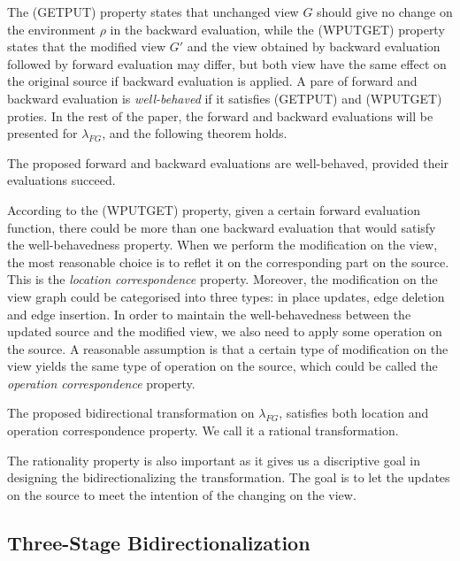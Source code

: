 \documentclass{llncs}
\begin{document}
The (GETPUT) property states that unchanged view $G$ should give no change on the environment $\rho$ in the backward evaluation, while the (WPUTGET) property states that the modified view $G'$ and the view obtained by backward evaluation followed by forward evaluation may differ, but both view have the same effect on the original source if backward evaluation is applied. A pare of forward and backward evaluation is \emph{well-behaved} if it satisfies (GETPUT) and (WPUTGET) proties. In the rest of the paper, the forward and backward evaluations will be presented for $\lambda_{FG}$, and the following theorem holds.

\begin{theorem}\label{th-wellb}
The proposed forward and backward evaluations are well-behaved, provided their evaluations succeed.
\end{theorem}

According to the (WPUTGET) property, given a certain forward evaluation function, there could be more than one backward evaluation that would satisfy the well-behavedness property. When we perform the modification on the view, the most reasonable choice is to reflet it on the corresponding part on the source. This is the \emph{location correspondence} property. Moreover, the modification on the view graph could be categorised into three types: in place updates, edge deletion and edge insertion. In order to maintain the well-behavedness between the updated source and the modified view, we also need to apply some operation on the source. A reasonable assumption is that a certain type of modification on the view yields the same type of operation on the source, which could be called the \emph{operation correspondence} property.

\begin{theorem}[Rationality]\label{th-rat}
The proposed bidirectional transformation on $\lambda_{FG}$, satisfies both location and operation correspondence property. We call it a rational transformation.
\end{theorem}

The rationality property is also important as it gives us a discriptive goal in designing the bidirectionalizing the transformation. The goal is to let the updates on the source to meet the intention of the changing on the view.

\subsection{Three-Stage Bidirectionalization}
\end{document}
